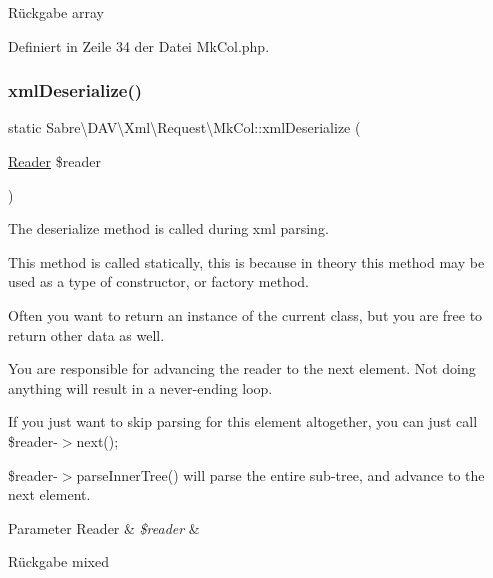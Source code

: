 \begin{DoxyReturn}{Rückgabe}
array 
\end{DoxyReturn}


Definiert in Zeile 34 der Datei Mk\+Col.\+php.

\mbox{\label{class_sabre_1_1_d_a_v_1_1_xml_1_1_request_1_1_mk_col_abdd8702a97c455a2d79d63eeae13285f}} 
\subsubsection{\texorpdfstring{xml\+Deserialize()}{xmlDeserialize()}}
{\footnotesize\ttfamily static Sabre\textbackslash{}\+D\+A\+V\textbackslash{}\+Xml\textbackslash{}\+Request\textbackslash{}\+Mk\+Col\+::xml\+Deserialize (\begin{DoxyParamCaption}\item[{\mbox{\hyperlink{class_sabre_1_1_xml_1_1_reader}{Reader}}}]{\$reader }\end{DoxyParamCaption})\hspace{0.3cm}{\ttfamily [static]}}

The deserialize method is called during xml parsing.

This method is called statically, this is because in theory this method may be used as a type of constructor, or factory method.

Often you want to return an instance of the current class, but you are free to return other data as well.

You are responsible for advancing the reader to the next element. Not doing anything will result in a never-\/ending loop.

If you just want to skip parsing for this element altogether, you can just call \$reader-\/$>$next();

\$reader-\/$>$parse\+Inner\+Tree() will parse the entire sub-\/tree, and advance to the next element.


\begin{DoxyParams}[1]{Parameter}
Reader & {\em \$reader} & \\
\hline
\end{DoxyParams}
\begin{DoxyReturn}{Rückgabe}
mixed 
\end{DoxyReturn}


